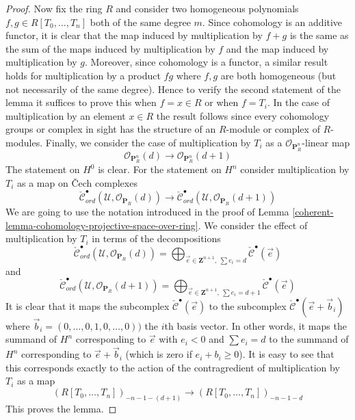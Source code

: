 \begin{proof}
\medskip\noindent
Now fix the ring $R$ and consider two homogeneous polynomials
$f, g \in R[T_0, \ldots, T_n]$ both of the same degree $m$.
Since cohomology is an additive functor, it is clear that the
map induced by multiplication by $f + g$ is the same as the sum
of the maps induced by multiplication by $f$ and the map induced
by multiplication by $g$. Moreover, since cohomology is a functor,
a similar result holds for multiplication by a product $fg$ where
$f, g$ are both homogeneous (but not necessarily of the same degree).
Hence to verify the second statement of the lemma it suffices to
prove this when $f = x \in R$ or when $f = T_i$.
In the case of multiplication by an element $x \in R$ the result
follows since every cohomology groups or complex in sight has the
structure of an $R$-module or complex of $R$-modules.
Finally, we consider the case of multiplication by $T_i$
as a $\mathcal{O}_{\mathbf{P}^n_R}$-linear map
$$
\mathcal{O}_{\mathbf{P}^n_R}(d)
\longrightarrow
\mathcal{O}_{\mathbf{P}^n_R}(d + 1)
$$
The statement on $H^0$ is clear. For the statement on $H^n$
consider multiplication by $T_i$ as a map on {\v C}ech complexes
$$
\check{\mathcal{C}}_{ord}^\bullet(\mathcal{U},
\mathcal{O}_{\mathbf{P}_R}(d))
\longrightarrow
\check{\mathcal{C}}_{ord}^\bullet(\mathcal{U},
\mathcal{O}_{\mathbf{P}_R}(d + 1))
$$
We are going to use the notation introduced in the proof of
Lemma \ref{coherent-lemma-cohomology-projective-space-over-ring}.
We consider the effect of multiplication by $T_i$
in terms of the decompositions
$$
\check{\mathcal{C}}_{ord}^\bullet(\mathcal{U}, \mathcal{O}_{\mathbf{P}_R}(d))
=
\bigoplus\nolimits_{\vec{e} \in \mathbf{Z}^{n + 1}, \ \sum e_i = d}
\check{\mathcal{C}}^\bullet(\vec{e})
$$
and
$$
\check{\mathcal{C}}_{ord}^\bullet(\mathcal{U},
\mathcal{O}_{\mathbf{P}_R}(d + 1))
=
\bigoplus\nolimits_{\vec{e} \in \mathbf{Z}^{n + 1}, \ \sum e_i = d + 1}
\check{\mathcal{C}}^\bullet(\vec{e})
$$
It is clear that it maps the subcomplex
$\check{\mathcal{C}}^\bullet(\vec{e})$ to the subcomplex
$\check{\mathcal{C}}^\bullet(\vec{e} + \vec{b}_i)$ where
$\vec{b}_i = (0, \ldots, 0, 1, 0, \ldots, 0))$ the $i$th basis vector.
In other words, it maps the summand of $H^n$ corresponding to
$\vec{e}$ with $e_i < 0$ and $\sum e_i = d$
to the summand of $H^n$ corresponding to
$\vec{e} + \vec{b}_i$ (which is zero if $e_i + b_i \geq 0$).
It is easy to see that this corresponds exactly to the action
of the contragredient of multiplication by $T_i$ as a map
$$
(R[T_0, \ldots, T_n])_{-n - 1 - (d + 1)}
\longrightarrow
(R[T_0, \ldots, T_n])_{-n - 1 - d}
$$
This proves the lemma.
\end{proof}

